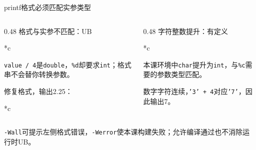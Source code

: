 \begin{frame}{printf格式必须匹配实参类型}
    \begin{columns}[T]
        \begin{column}{0.48\textwidth}
            \small \alert{格式与实参不匹配：UB}
            \begin{Code}*{c}
                
            \end{Code}
            \small \texttt{value / 4}是\texttt{double}，\texttt{\%d}却要求\texttt{int}；格式串不会替你转换参数。
            \medskip

            修复格式，输出\alert{2.25}：
            \begin{Code}*{c}
                
            \end{Code}
        \end{column}
        \begin{column}{0.48\textwidth}
            \small \alert{字符整数提升：有定义}
            \begin{Code}*{c}
                
            \end{Code}
            \small 本课环境中\texttt{char}提升为\texttt{int}，与\texttt{\%c}需要的参数类型匹配。
            \par\medskip
            数字字符连续，\texttt{'3' + 4}对应\texttt{'7'}，因此输出\alert{7}。
        \end{column}
    \end{columns}
    \medskip
    \footnotesize \texttt{-Wall}可提示左侧格式错误，\texttt{-Werror}使本课构建失败；允许编译通过也不消除运行时UB。
\end{frame}

